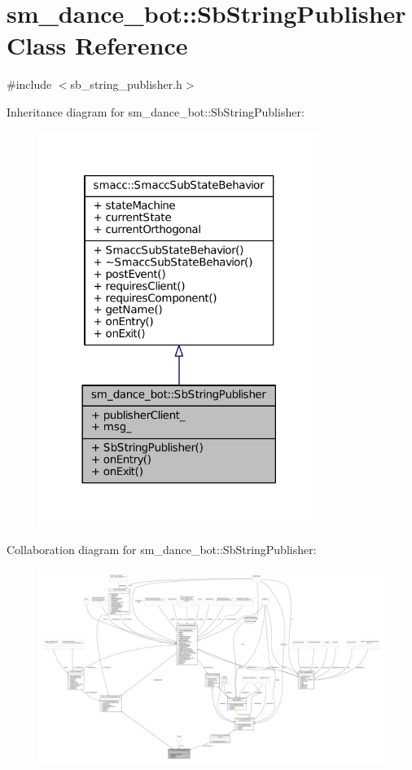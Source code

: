 \hypertarget{classsm__dance__bot_1_1SbStringPublisher}{}\section{sm\+\_\+dance\+\_\+bot\+:\+:Sb\+String\+Publisher Class Reference}
\label{classsm__dance__bot_1_1SbStringPublisher}


{\ttfamily \#include $<$sb\+\_\+string\+\_\+publisher.\+h$>$}



Inheritance diagram for sm\+\_\+dance\+\_\+bot\+:\+:Sb\+String\+Publisher\+:
\nopagebreak
\begin{figure}[H]
\begin{center}
\leavevmode
\includegraphics[width=258pt]{classsm__dance__bot_1_1SbStringPublisher__inherit__graph}
\end{center}
\end{figure}


Collaboration diagram for sm\+\_\+dance\+\_\+bot\+:\+:Sb\+String\+Publisher\+:
\nopagebreak
\begin{figure}[H]
\begin{center}
\leavevmode
\includegraphics[width=350pt]{classsm__dance__bot_1_1SbStringPublisher__coll__graph}
\end{center}
\end{figure}
